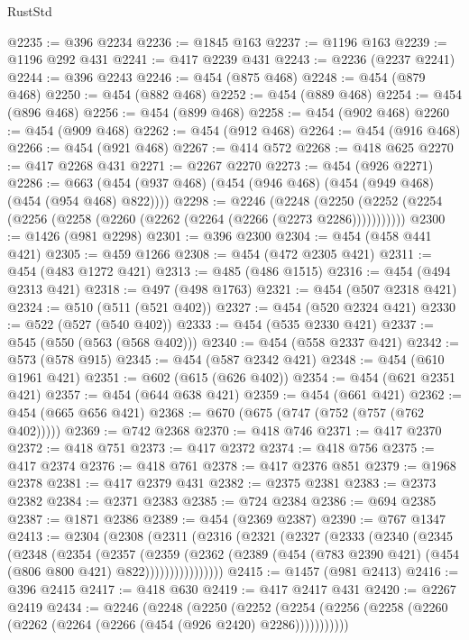 \begin{lexlean}{RustStd}
\begin{coremodule}
@2235 := @396 @2234
@2236 := @1845 @163
@2237 := @1196 @163
@2239 := @1196 @292 @431
@2241 := @417 @2239 @431
@2243 := @2236 (@2237 @2241)
@2244 := @396 @2243
@2246 := @454 (@875 @468)
@2248 := @454 (@879 @468)
@2250 := @454 (@882 @468)
@2252 := @454 (@889 @468)
@2254 := @454 (@896 @468)
@2256 := @454 (@899 @468)
@2258 := @454 (@902 @468)
@2260 := @454 (@909 @468)
@2262 := @454 (@912 @468)
@2264 := @454 (@916 @468)
@2266 := @454 (@921 @468)
@2267 := @414 @572
@2268 := @418 @625
@2270 := @417 @2268 @431
@2271 := @2267 @2270
@2273 := @454 (@926 @2271)
@2286 := @663 (@454 (@937 @468) (@454 (@946 @468) (@454 (@949 @468) (@454 (@954 @468) @822))))
@2298 := @2246
    (@2248 (@2250 (@2252 (@2254 (@2256 (@2258 (@2260 (@2262 (@2264 (@2266 (@2273 @2286)))))))))))
@2300 := @1426 (@981 @2298)
@2301 := @396 @2300
@2304 := @454 (@458 @441 @421)
@2305 := @459 @1266
@2308 := @454 (@472 @2305 @421)
@2311 := @454 (@483 @1272 @421)
@2313 := @485 (@486 @1515)
@2316 := @454 (@494 @2313 @421)
@2318 := @497 (@498 @1763)
@2321 := @454 (@507 @2318 @421)
@2324 := @510 (@511 (@521 @402))
@2327 := @454 (@520 @2324 @421)
@2330 := @522 (@527 (@540 @402))
@2333 := @454 (@535 @2330 @421)
@2337 := @545 (@550 (@563 (@568 @402)))
@2340 := @454 (@558 @2337 @421)
@2342 := @573 (@578 @915)
@2345 := @454 (@587 @2342 @421)
@2348 := @454 (@610 @1961 @421)
@2351 := @602 (@615 (@626 @402))
@2354 := @454 (@621 @2351 @421)
@2357 := @454 (@644 @638 @421)
@2359 := @454 (@661 @421)
@2362 := @454 (@665 @656 @421)
@2368 := @670 (@675 (@747 (@752 (@757 (@762 @402)))))
@2369 := @742 @2368
@2370 := @418 @746
@2371 := @417 @2370
@2372 := @418 @751
@2373 := @417 @2372
@2374 := @418 @756
@2375 := @417 @2374
@2376 := @418 @761
@2378 := @417 @2376 @851
@2379 := @1968 @2378
@2381 := @417 @2379 @431
@2382 := @2375 @2381
@2383 := @2373 @2382
@2384 := @2371 @2383
@2385 := @724 @2384
@2386 := @694 @2385
@2387 := @1871 @2386
@2389 := @454 (@2369 @2387)
@2390 := @767 @1347
@2413 := @2304
    (@2308
      (@2311
        (@2316
          (@2321
            (@2327
              (@2333
                (@2340
                  (@2345
                    (@2348
                      (@2354
                        (@2357
                          (@2359
                            (@2362
                              (@2389
                                (@454 (@783 @2390 @421) (@454 (@806 @800 @421) @822))))))))))))))))
@2415 := @1457 (@981 @2413)
@2416 := @396 @2415
@2417 := @418 @630
@2419 := @417 @2417 @431
@2420 := @2267 @2419
@2434 := @2246
    (@2248
      (@2250
        (@2252 (@2254 (@2256 (@2258 (@2260 (@2262 (@2264 (@2266 (@454 (@926 @2420) @2286)))))))))))

\end{coremodule}
\end{lexlean}
